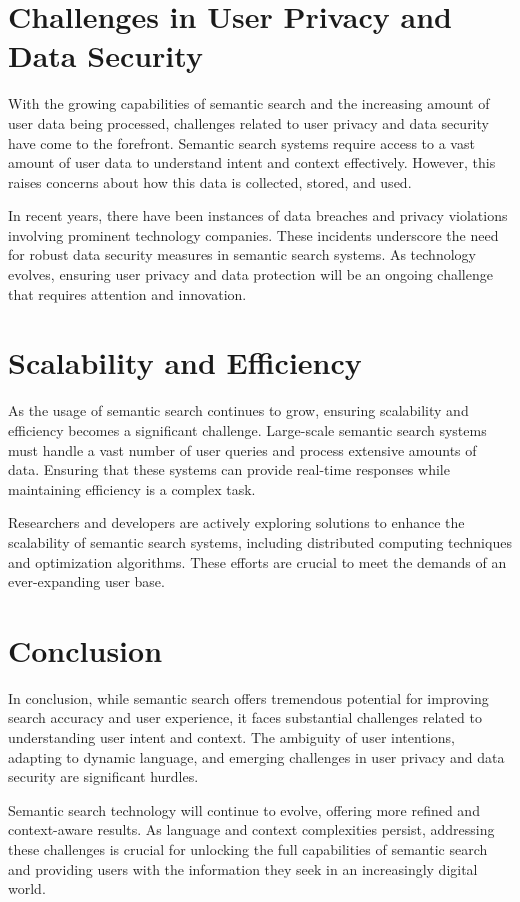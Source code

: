 \documentclass[10pt,oneside,a4paper]{article}
\begin{document}
\section{Challenges in User Privacy and Data Security}
With the growing capabilities of semantic search and the increasing amount of user data being processed, challenges related to user privacy and data security have come to the forefront. Semantic search systems require access to a vast amount of user data to understand intent and context effectively. However, this raises concerns about how this data is collected, stored, and used.

In recent years, there have been instances of data breaches and privacy violations involving prominent technology companies. These incidents underscore the need for robust data security measures in semantic search systems. As technology evolves, ensuring user privacy and data protection will be an ongoing challenge that requires attention and innovation.

\section{Scalability and Efficiency}
As the usage of semantic search continues to grow, ensuring scalability and efficiency becomes a significant challenge. Large-scale semantic search systems must handle a vast number of user queries and process extensive amounts of data. Ensuring that these systems can provide real-time responses while maintaining efficiency is a complex task.

Researchers and developers are actively exploring solutions to enhance the scalability of semantic search systems, including distributed computing techniques and optimization algorithms. These efforts are crucial to meet the demands of an ever-expanding user base.

\section{Conclusion}
In conclusion, while semantic search offers tremendous potential for improving search accuracy and user experience, it faces substantial challenges related to understanding user intent and context. The ambiguity of user intentions, adapting to dynamic language, and emerging challenges in user privacy and data security are significant hurdles.

Semantic search technology will continue to evolve, offering more refined and context-aware results. As language and context complexities persist, addressing these challenges is crucial for unlocking the full capabilities of semantic search and providing users with the information they seek in an increasingly digital world.
\end{document}
